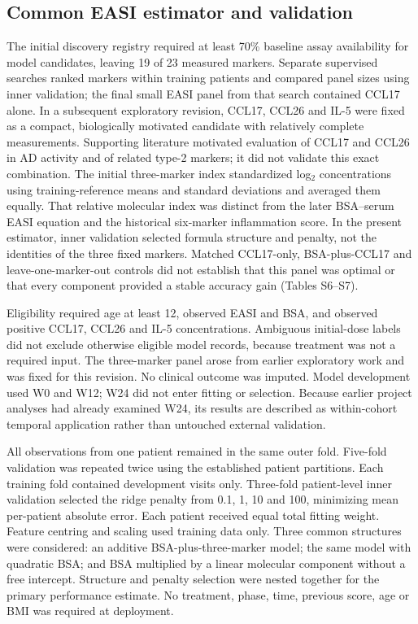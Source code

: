 \subsection{Common EASI estimator and validation}
The initial discovery registry required at least 70\% baseline assay availability for model candidates, leaving 19 of 23 measured markers. Separate supervised searches ranked markers within training patients and compared panel sizes using inner validation; the final small EASI panel from that search contained CCL17 alone. In a subsequent exploratory revision, CCL17, CCL26 and IL-5 were fixed as a compact, biologically motivated candidate with relatively complete measurements. Supporting literature motivated evaluation of CCL17 and CCL26 in AD activity and of related type-2 markers; it did not validate this exact combination.\citep{Holm2021Immunoinflammatory,Kagami2003CCL26} The initial three-marker index standardized log$_2$ concentrations using training-reference means and standard deviations and averaged them equally. That relative molecular index was distinct from the later BSA--serum EASI equation and the historical six-marker inflammation score. In the present estimator, inner validation selected formula structure and penalty, not the identities of the three fixed markers. Matched CCL17-only, BSA-plus-CCL17 and leave-one-marker-out controls did not establish that this panel was optimal or that every component provided a stable accuracy gain (Tables S6--S7).

Eligibility required age at least 12, observed EASI and BSA, and observed positive CCL17, CCL26 and IL-5 concentrations. Ambiguous initial-dose labels did not exclude otherwise eligible model records, because treatment was not a required input. The three-marker panel arose from earlier exploratory work and was fixed for this revision. No clinical outcome was imputed. Model development used W0 and W12; W24 did not enter fitting or selection. Because earlier project analyses had already examined W24, its results are described as within-cohort temporal application rather than untouched external validation.

All observations from one patient remained in the same outer fold. Five-fold validation was repeated twice using the established patient partitions. Each training fold contained development visits only. Three-fold patient-level inner validation selected the ridge penalty from 0.1, 1, 10 and 100, minimizing mean per-patient absolute error. Each patient received equal total fitting weight. Feature centring and scaling used training data only. Three common structures were considered: an additive BSA-plus-three-marker model; the same model with quadratic BSA; and BSA multiplied by a linear molecular component without a free intercept. Structure and penalty selection were nested together for the primary performance estimate. No treatment, phase, time, previous score, age or BMI was required at deployment.

